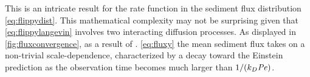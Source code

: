 This is an intricate result for the rate function in the sediment flux distribution \DIFaddbegin {}\DIFaddend \ref{eq:flippydist}. This mathematical complexity may not be surprising given that \DIFdelbegin {}\DIFdelend \DIFaddbegin {}\DIFaddend \ref{eq:flippylangevin} involves two interacting diffusion processes. As displayed in \DIFdelbegin {}\DIFdelend \DIFaddbegin {}\DIFaddend \ref{fig:fluxconvergence}, as a result of \DIFdelbegin {}\DIFdelend \DIFaddbegin {}\DIFaddend . \ref{eq:fluxy} the mean sediment flux takes on a non-trivial scale-dependence, characterized by a decay toward the Einstein prediction \DIFdelbegin {}\DIFdelend \DIFaddbegin {}\DIFaddend as the observation time becomes much larger than $1/(k_D \mbox{\textit{Pe}})$. 

